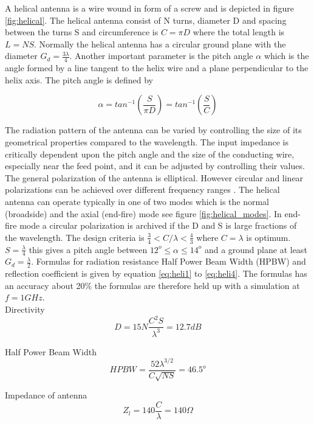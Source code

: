 A helical antenna is a wire wound in form of a screw and is depicted in figure \ref{fig:helical}. The helical antenna consist of N turns, diameter D and spacing between the turns S and circumference is $C = \pi D$ where the total length is $L = NS$. Normally the helical antenna has a circular ground plane with the diameter $G_d = \frac{3\lambda}{4}$. Another important parameter is the pitch angle $\alpha$ which is the angle formed by a line tangent to the helix wire and a plane perpendicular to the helix axis. The pitch angle is defined by   

\begin{equation}
\alpha = tan^{-1}(\frac{S}{\pi D}) = tan^{-1}(\frac{S}{C})
\end{equation} 

The radiation pattern of the antenna can be varied by controlling the size of its
geometrical properties compared to the wavelength. The input impedance is critically
dependent upon the pitch angle and the size of the conducting wire, especially near the
feed point, and it can be adjusted by controlling their values. The general polarization
of the antenna is elliptical. However circular and linear polarizations can be achieved
over different frequency ranges \citep{Balanis2005}. The helical antenna can operate typically in one of two modes which is
the normal (broadside) and the axial (end-fire) mode see figure \ref{fig:helical_modes}. In end-fire mode a circular polarization is archived if the D and S is large fractions of the wavelength. The design criteria is $\frac{3}{4} < C/\lambda < \frac{4}{3}$ where $C = \lambda$ is optimum. $S = \frac{\lambda}{4}$ this gives a pitch angle between $12^o \leq \alpha \leq 14^o $ and a ground plane at least $G_d = \frac{\lambda}{2}$. Formulas for radiation resistance Half Power Beam Width (HPBW) and reflection coefficient is given by equation \ref{eq:heli1} to \ref{eq:heli4}. The formulas has an accuracy about 20\% the formulas are therefore held up with a simulation at $f = 1GHz$.\\

Directivity
\begin{equation}
D =  15N\frac{C^2 S}{\lambda^3} = 12.7dB
\end{equation}  
\label{eq:heli1}

Half Power Beam Width
\begin{equation}
HPBW = \frac{52\lambda^{3/2} }{C\sqrt{NS}} = 46.5^o
\end{equation}  
\label{eq:heli2}

Impedance of antenna 
\begin{equation}
Z_l = 140\frac{C}{\lambda} = 140\Omega
\end{equation} 
\label{eq:heli3}
 
